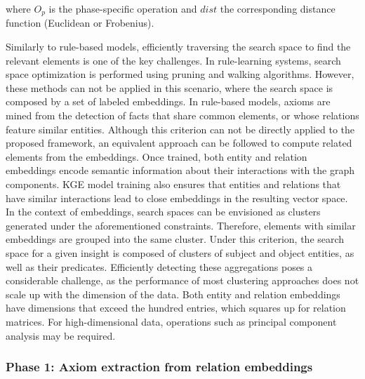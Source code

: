 where $O_p$ is the phase-specific operation and $dist$ the corresponding distance function (Euclidean or Frobenius). 

Similarly to rule-based models, efficiently traversing the search space to find the relevant elements is one of the key challenges. In rule-learning systems, search space optimization is performed using pruning and walking algorithms. However, these methods can not be applied in this scenario, where the search space is composed by a set of labeled embeddings. In rule-based models, axioms are mined from the detection of facts that share common elements, or whose relations feature similar entities. Although this criterion can not be directly applied to the proposed framework, an equivalent approach can be followed to compute related elements from the embeddings. Once trained, both entity and relation embeddings encode semantic information about their interactions with the graph components. KGE model training also ensures that entities and relations that have similar interactions lead to close embeddings in the resulting vector space. 
In the context of embeddings, search spaces can be envisioned as clusters generated under the aforementioned constraints. Therefore, elements with similar embeddings are grouped into the same cluster. Under this criterion, the search space for a given insight is composed of clusters of subject and object entities, as well as their predicates. Efficiently detecting these aggregations poses a considerable challenge, as the performance of most clustering approaches does not scale up with the dimension of the data. Both entity and relation embeddings have dimensions that exceed the hundred entries, which squares up for relation matrices. For high-dimensional data, operations such as principal component analysis may be required.

\subsubsection*{Phase 1: Axiom extraction from relation embeddings}

